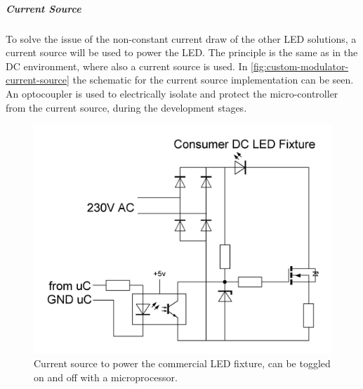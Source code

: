 


\subparagraph{Current Source}



	To solve the issue of the non-constant current draw of the other LED solutions, a current source will be used to power the LED.
	The principle is the same as in the DC environment, where also a current source is used.
	In \autoref{fig:custom-modulator-current-source} the schematic for the current source implementation can be seen.
	An optocoupler is used to electrically isolate and protect the micro-controller from the current source, during the development stages.


	\begin{figure}[ht]
		\centering
		\begin{minipage}[b]{0.49\textwidth}
			\includegraphics[width=\textwidth]{chapters/hardware-chapters/AC/ac-modulator/custom-hardware/ac-current-source/custom-modulator-current-source.JPG}
			\caption{Current source to power the commercial LED fixture, can be toggled on and off with a microprocessor.}
			\label{fig:custom-modulator-current-source}
		\end{minipage}
		\hfill
		\begin{minipage}[b]{0.49\textwidth}

\end{minipage}
\end{figure}
